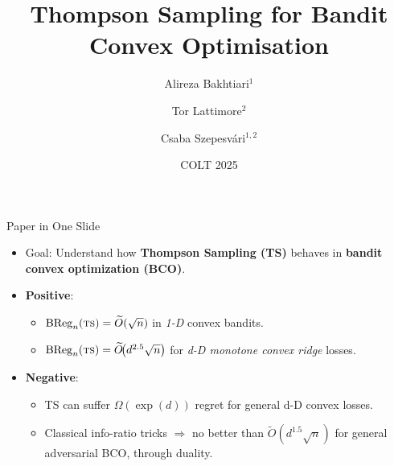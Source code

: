 \documentclass{beamer}
\title[Thompson Sampling for BCO]{Thompson Sampling for Bandit Convex Optimisation}
\author{Alireza Bakhtiari$^1$ \and Tor Lattimore$^2$ \and Csaba Szepesvári$^{1,2}$}
\institute{University of Alberta$^1$ \quad \& \quad Google DeepMind$^2$}
\date{COLT 2025}
\newcommand{\BReg}{\operatorname{BReg}}
\newcommand{\ts}{{\textsc{ts}}}
\begin{document}
\begin{frame}
    \titlepage
\end{frame}

\begin{frame}{Paper in One Slide}
    \begin{itemize}
        \item \alert{Goal}: Understand how \textbf{Thompson Sampling (TS)} behaves in \textbf{bandit convex optimization (BCO)}.
        \item \textbf{Positive}:
              \begin{itemize}
                  \item $\BReg_n(\ts) = \widetilde{O}(\sqrt{n})$ in \emph{1-D} convex bandits.
                  \item $\BReg_n(\ts) = \widetilde{O}\!\bigl(d^{2.5}\sqrt{n}\bigr)$ for \emph{d-D monotone convex ridge} losses.
              \end{itemize}
        \item \textbf{Negative}:
              \begin{itemize}
                  \item TS can suffer \(\Omega(\exp(d))\) regret for general d-D convex losses.
                  \item Classical info-ratio tricks \(\Rightarrow\) no better than \(\widetilde{O}(d^{1.5}\sqrt{n})\) for general adversarial BCO, through duality.
              \end{itemize}
    \end{itemize}
\end{frame}
\end{document}

